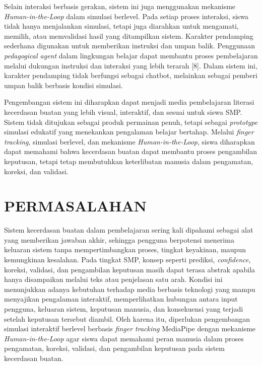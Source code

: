 \documentclass[10pt,twoside,openright]{report}
\begin{document}
Selain interaksi berbasis gerakan, sistem ini juga menggunakan mekanisme \textit{Human-in-the-Loop} dalam simulasi berlevel. Pada setiap proses interaksi, siswa tidak hanya menjalankan simulasi, tetapi juga diarahkan untuk mengamati, memilih, atau memvalidasi hasil yang ditampilkan sistem. Karakter pendamping sederhana digunakan untuk memberikan instruksi dan umpan balik. Penggunaan \textit{pedagogical agent} dalam lingkungan belajar dapat membantu proses pembelajaran melalui dukungan instruksi dan interaksi yang lebih terarah [8]. Dalam sistem ini, karakter pendamping tidak berfungsi sebagai chatbot, melainkan sebagai pemberi umpan balik berbasis kondisi simulasi.

Pengembangan sistem ini diharapkan dapat menjadi media pembelajaran literasi kecerdasan buatan yang lebih visual, interaktif, dan sesuai untuk siswa SMP. Sistem tidak ditujukan sebagai produk permainan penuh, tetapi sebagai \textit{prototype} simulasi edukatif yang menekankan pengalaman belajar bertahap. Melalui \textit{finger tracking}, simulasi berlevel, dan mekanisme \textit{Human-in-the-Loop}, siswa diharapkan dapat memahami bahwa kecerdasan buatan dapat membantu proses pengambilan keputusan, tetapi tetap membutuhkan keterlibatan manusia dalam pengamatan, koreksi, dan validasi.

\section{PERMASALAHAN}
\label{sec:permasalahan}

Sistem kecerdasan buatan dalam pembelajaran sering kali dipahami sebagai alat yang memberikan jawaban akhir, sehingga pengguna berpotensi menerima keluaran sistem tanpa mempertimbangkan proses, tingkat keyakinan, maupun kemungkinan kesalahan. Pada tingkat SMP, konsep seperti prediksi, \textit{confidence}, koreksi, validasi, dan pengambilan keputusan masih dapat terasa abstrak apabila hanya disampaikan melalui teks atau penjelasan satu arah. Kondisi ini menunjukkan adanya kebutuhan terhadap media berbasis teknologi yang mampu menyajikan pengalaman interaktif, memperlihatkan hubungan antara input pengguna, keluaran sistem, keputusan manusia, dan konsekuensi yang terjadi setelah keputusan tersebut diambil. Oleh karena itu, diperlukan pengembangan simulasi interaktif berlevel berbasis \textit{finger tracking} MediaPipe dengan mekanisme \textit{Human-in-the-Loop} agar siswa dapat memahami peran manusia dalam proses pengamatan, koreksi, validasi, dan pengambilan keputusan pada sistem kecerdasan buatan.
\end{document}
